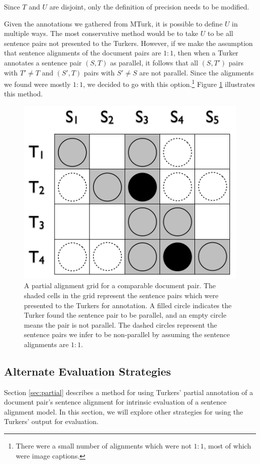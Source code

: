 \documentclass[11pt,letterpaper]{article}
\begin{document}
Since $T$ and $U$ are disjoint, only the definition of precision needs to
be modified. 

Given the annotations we gathered from MTurk, it is possible to define $U$ in
multiple ways. The most conservative method would be to take $U$ to be all
sentence pairs not presented to the Turkers. However, if we make the assumption
that sentence alignments of the document pairs are $1:1$, then when a Turker
annotates a sentence pair $(S, T)$ as parallel, it follows that all $(S, T')$
pairs with $T' \neq T$ and $(S', T)$ pairs with $S' \neq S$ are not parallel.
Since the alignments we found were mostly $1:1$, we decided to go with this
option.\footnote{There were a small number of alignments which were not $1:1$,
most of which were image captions.} Figure \ref{fig:partial_align} illustrates
this method.

\begin{figure}
\begin{center}
\includegraphics[scale=0.5]{images/partial_alignment.png}
\caption{A partial alignment grid for a comparable document pair. The shaded
cells in the grid represent the sentence pairs which were presented to the
Turkers for annotation. A filled circle indicates the Turker found the sentence
pair to be parallel, and an empty circle means the pair is not parallel. The
dashed circles represent the sentence pairs we infer to be non-parallel by
assuming the sentence alignments are $1:1$.}
\label{fig:partial_align}
\end{center}
\end{figure}

\subsection{Alternate Evaluation Strategies}
Section \ref{sec:partial} describes a method for using Turkers' partial
annotation of a document pair's sentence alignment for intrinsic evaluation of a
sentence alignment model. In this section, we will explore other
strategies for using the Turkers' output for evaluation.
\end{document}
